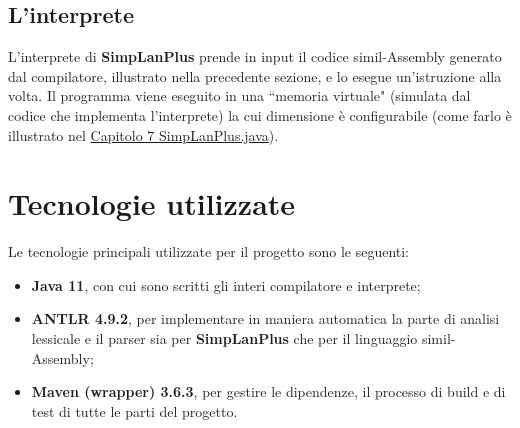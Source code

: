 \documentclass[../report.tex]{subfiles}
\begin{document}
\subsection{L'interprete}
L'interprete di \textbf{SimpLanPlus} prende in input il codice simil-Assembly generato dal compilatore, illustrato nella precedente sezione, e lo esegue un'istruzione alla volta.
Il programma viene eseguito in una ``memoria virtuale" (simulata dal codice che implementa l'interprete) la cui dimensione è configurabile (come farlo è illustrato nel \hyperref[c:simplanplus-java]{Capitolo 7 SimpLanPlus.java}).

\section{Tecnologie utilizzate}\label{s:teconologie-utilizzate}
Le tecnologie principali utilizzate per il progetto sono le seguenti:
\begin{itemize}
    \item \textbf{Java 11}, con cui sono scritti gli interi compilatore e interprete;
    \item \textbf{ANTLR 4.9.2}, per implementare in maniera automatica la parte di analisi lessicale e il parser sia per \textbf{SimpLanPlus} che per il linguaggio simil-Assembly;
    \item \textbf{Maven (wrapper) 3.6.3}, per gestire le dipendenze, il processo di build e di test di tutte le parti del progetto.
\end{itemize}
\end{document}
